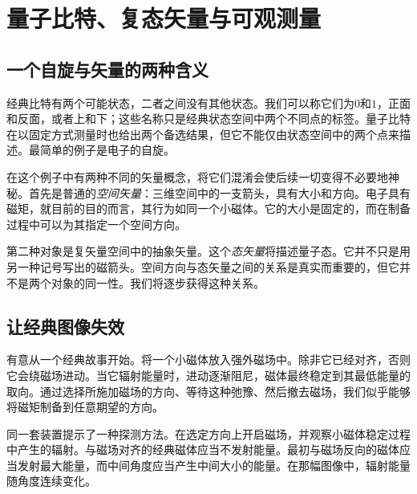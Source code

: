 \chapter{量子比特、复态矢量与可观测量}


\section{一个自旋与矢量的两种含义}

经典比特有两个可能状态，二者之间没有其他状态。我们可以称它们为\(0\)和\(1\)，正面和反面，或者上和下；这些名称只是经典状态空间中两个不同点的标签。量子比特在以固定方式测量时也给出两个备选结果，但它不能仅由状态空间中的两个点来描述。最简单的例子是电子的自旋。

在这个例子中有两种不同的矢量概念，将它们混淆会使后续一切变得不必要地神秘。首先是普通的\emph{空间矢量}：三维空间中的一支箭头，具有大小和方向。电子具有磁矩，就目前的目的而言，其行为如同一个小磁体。它的大小是固定的，而在制备过程中可以为其指定一个空间方向。

第二种对象是复矢量空间中的抽象矢量。这个\emph{态矢量}将描述量子态。它并不只是用另一种记号写出的磁箭头。空间方向与态矢量之间的关系是真实而重要的，但它并不是两个对象的同一性。我们将逐步获得这种关系。

\section{让经典图像失效}

有意从一个经典故事开始。将一个小磁体放入强外磁场中。除非它已经对齐，否则它会绕磁场进动。当它辐射能量时，进动逐渐阻尼，磁体最终稳定到其最低能量的取向。通过选择所施加磁场的方向、等待这种弛豫、然后撤去磁场，我们似乎能够将磁矩制备到任意期望的方向。

同一套装置提示了一种探测方法。在选定方向上开启磁场，并观察小磁体稳定过程中产生的辐射。与磁场对齐的经典磁体应当不发射能量。最初与磁场反向的磁体应当发射最大能量，而中间角度应当产生中间大小的能量。在那幅图像中，辐射能量随角度连续变化。

